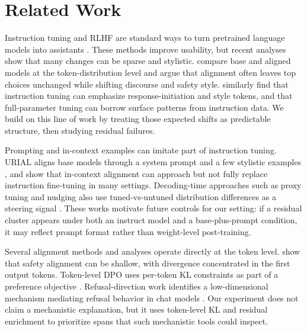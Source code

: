 \section{Related Work}
\label{sec:related}

Instruction tuning and RLHF are standard ways to turn pretrained language models into assistants \citep{wei2021finetuned,ouyang2022training,chung2022scaling,longpre2023flan}. These methods improve usability, but recent analyses show that many changes can be sparse and stylistic. \citet{lin2023unlocking} compare base and aligned models at the token-distribution level and argue that alignment often leaves top choices unchanged while shifting discourse and safety style. \citet{ghosh2024limitations} similarly find that instruction tuning can emphasize response-initiation and style tokens, and that full-parameter tuning can borrow surface patterns from instruction data. We build on this line of work by treating those expected shifts as predictable structure, then studying residual failures.

Prompting and in-context examples can imitate part of instruction tuning. URIAL aligns base models through a system prompt and a few stylistic examples \citep{lin2023unlocking}, and \citet{zhao2024context} show that in-context alignment can approach but not fully replace instruction fine-tuning in many settings. Decoding-time approaches such as proxy tuning and nudging also use tuned-vs-untuned distribution differences as a steering signal \citep{liu2024proxy,fei2024nudging}. These works motivate future controls for our setting: if a residual cluster appears under both an instruct model and a base-plus-prompt condition, it may reflect prompt format rather than weight-level post-training.

Several alignment methods and analyses operate directly at the token level. \citet{qi2024safety} show that safety alignment can be shallow, with divergence concentrated in the first output tokens. Token-level DPO uses per-token KL constraints as part of a preference objective \citep{zeng2024token}. Refusal-direction work identifies a low-dimensional mechanism mediating refusal behavior in chat models \citep{arditi2024refusal}. Our experiment does not claim a mechanistic explanation, but it uses token-level KL and residual enrichment to prioritize spans that such mechanistic tools could inspect.

